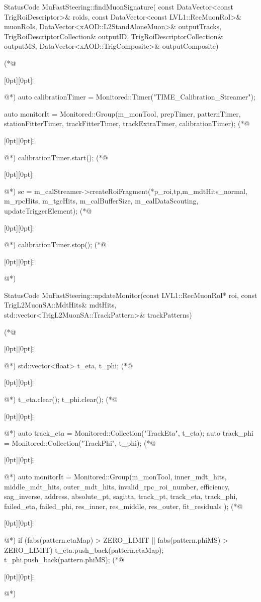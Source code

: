 \begin{cpp}[caption={Fragment kodu algorytmu~\cite{histogram-fill}, odpowiadającego za wypełnienie histogramu przedstawionego na rysunku~\ref{fig:athena:histogram_TH1_time}, za pomocą zmiennej monitorowanej `TIME\_Calibration\_Streamer`.}, label={lst:athena:time_calibration_streamer}]
StatusCode MuFastSteering::findMuonSignature(
  const DataVector<const TrigRoiDescriptor>& roids,
  const DataVector<const LVL1::RecMuonRoI>& muonRoIs,
  DataVector<xAOD::L2StandAloneMuon>& outputTracks,
  TrigRoiDescriptorCollection& outputID,
  TrigRoiDescriptorCollection& outputMS,
  DataVector<xAOD::TrigComposite>& outputComposite)
{
(*@\centerline{\raisebox{-1pt}[0pt][0pt]{$\vdots$}}@*)
  auto calibrationTimer = Monitored::Timer("TIME_Calibration_Streamer");

  auto monitorIt	= Monitored::Group(m_monTool, prepTimer, patternTimer, stationFitterTimer, trackFitterTimer, trackExtraTimer, calibrationTimer);
(*@\centerline{\raisebox{-1pt}[0pt][0pt]{$\vdots$}}@*)
  calibrationTimer.start();
(*@\centerline{\raisebox{-1pt}[0pt][0pt]{$\vdots$}}@*)
  sc = m_calStreamer->createRoiFragment(*p_roi,tp,m_mdtHits_normal, m_rpcHits, m_tgcHits, m_calBufferSize, m_calDataScouting, updateTriggerElement); 
(*@\centerline{\raisebox{-1pt}[0pt][0pt]{$\vdots$}}@*)
  calibrationTimer.stop();
(*@\centerline{\raisebox{-1pt}[0pt][0pt]{$\vdots$}}@*)
}
\end{cpp}

\begin{cpp}[caption={Fragment kodu algorytmu~\cite{histogram-fill}, odpowiadającego za wypełnienie histogramu przedstawionego na rysunku~\ref{fig:athena:histogram_TH2}, za pomocą monitorowanych kolekcji `TrackEta` oraz `TrackPhi`.}, label={lst:athena:track_eta_vs_track_phi}]
StatusCode MuFastSteering::updateMonitor(const LVL1::RecMuonRoI* roi,
  const TrigL2MuonSA::MdtHits& mdtHits,
  std::vector<TrigL2MuonSA::TrackPattern>& trackPatterns)
{
(*@\centerline{\raisebox{-1pt}[0pt][0pt]{$\vdots$}}@*)
  std::vector<float> t_eta, t_phi;
(*@\centerline{\raisebox{-1pt}[0pt][0pt]{$\vdots$}}@*)
  t_eta.clear();
  t_phi.clear();
(*@\centerline{\raisebox{-1pt}[0pt][0pt]{$\vdots$}}@*)
  auto track_eta	= Monitored::Collection("TrackEta", t_eta);
  auto track_phi	= Monitored::Collection("TrackPhi", t_phi);
(*@\centerline{\raisebox{-1pt}[0pt][0pt]{$\vdots$}}@*)
  auto monitorIt	= Monitored::Group(m_monTool, inner_mdt_hits, middle_mdt_hits, outer_mdt_hits, invalid_rpc_roi_number, efficiency, sag_inverse, address, absolute_pt, sagitta, track_pt, track_eta, track_phi, failed_eta, failed_phi, res_inner, res_middle, res_outer, fit_residuals );
(*@\centerline{\raisebox{-1pt}[0pt][0pt]{$\vdots$}}@*)
  if (fabs(pattern.etaMap) > ZERO_LIMIT || fabs(pattern.phiMS) > ZERO_LIMIT) {
    t_eta.push_back(pattern.etaMap);
    t_phi.push_back(pattern.phiMS);
  }
(*@\centerline{\raisebox{-1pt}[0pt][0pt]{$\vdots$}}@*)
}
\end{cpp}

